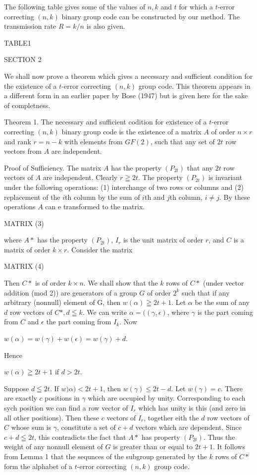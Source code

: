 \documentclass{article}
\begin{document}
The following table gives some of the values of $n,k$ and $t$ for which a $t$-error correcting $(n,k)$ binary group code can be constructed by our method. The transmission rate $R=k/n$ is also given.

TABLE1

SECTION 2

We shall now prove a theorem which gives a necessary and sufficient condition for the existence of a $t$-error correcting $(n,k)$ group code. This theorem appears in a different form in an earlier paper by Bose (1947) but is given here for the sake of completness.

Theorem 1. The necessary and sufficient codition for existence of a $t$-error correcting $(n,k)$ binary group code is the existence of a matrix $A$ of order $n\times r$ and rank $r=n-k$ with elements from $GF(2)$, such that any set of $2t$ row vectors from $A$ are independent.

Proof of Sufficiency. The matrix $A$ has the property $(P_{2t})$ that any $2t$ row vectors of $A$ are independent. Clearly $r\geqq 2t$. The property $(P_{2t})$ is invariant under the following operations: (1) interchange of two rows or columns and (2) replacement of the $i$th column by the sum of $i$th and $j$th column, $i\neq j$. By these operations $A$ can e transformed to the matrix.

MATRIX (3)

where $A*$ has the property $(P_{2t})$, $I_r$ is the unit matrix of order $r$, and $C$ is a matrix of order $k\times r$. Consider the matrix

MATRIX (4)

Then $C*$ is of order $k\times n$. We shall show that the $k$ rows of $C*$ (under vector addition (mod 2)) are generators of a group $G$ of order $2^k$ such that if any arbitrary (nonnull) element of G, then $w(\alpha)\geqq2t+1$. Let $\alpha$ be the sum of any $d$ row vectors of $C*, d\leqq k$. We can write $\alpha=((\gamma,\epsilon)$, where $\gamma$ is the part coming from $C$ and $\epsilon$ the part coming from $I_k$. Now 

$w(\alpha)=w(\gamma)+w(\epsilon)=w(\gamma)+d$.

Hence

$w(\alpha)\geqq2t+1$ if $d>2t$.

Suppose $d\leqq 2t$. If $w)\alpha)<2t+1$, then $w(\gamma)\leq2t-d$. Let $w(\gamma)=c$. There are exactly $c$ positions in $\gamma$ which are occupied by unity. Corresponding to each sych position we can find a row vector of $I_r$ which has unity is this (and zero in all other positions). Then these $c$ vectors of $I_r$, together eith the $d$ row vectors of $C$ whose sum is $\gamma$, constitute a set of $c+d$ vectors which are dependent. Since $c+d\leqq 2t$, this contradicts the fact that $A*$ has property $(P_{2t})$. Thus the weight of any nonnull element of $G$ is greater than or equal to $2t+1$. It follows from Lemma 1 that the sequnces of the subgroup generated by the $k$ rows of $C*$ form the alphabet of a $t$-error correcting $(n,k)$ group code.
\end{document}
